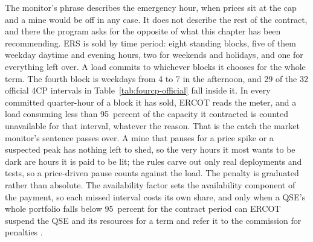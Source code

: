The monitor's phrase describes the emergency hour, when prices sit at the cap and a mine would be off in any case. It does not describe the rest of the contract, and there the program asks for the opposite of what this chapter has been recommending. ERS is sold by time period: eight standing blocks, five of them weekday daytime and evening hours, two for weekends and holidays, and one for everything left over. A load commits to whichever blocks it chooses for the whole term. %
The fourth block is weekdays from 4 to 7 in the afternoon, and 29 of the 32 official 4CP intervals in Table~\ref{tab:fourcp-official} fall inside it. %
In every committed quarter-hour of a block it has sold, ERCOT reads the meter, and a load consuming less than 95~percent of the capacity it contracted is counted unavailable for that interval, whatever the reason. %
That is the catch the market monitor's sentence passes over. A mine that pauses for a price spike or a suspected peak has nothing left to shed, so the very hours it most wants to be dark are hours it is paid to be lit; the rules carve out only real deployments and tests, so a price-driven pause counts against the load. %
The penalty is graduated rather than absolute. The availability factor sets the availability component of the payment, so each missed interval costs its own share, and only when a QSE's whole portfolio falls below 95~percent for the contract period can ERCOT suspend the QSE and its resources for a term and refer it to the commission for penalties \autocite{ercot2026protocols,ercotersreq2026}. %
